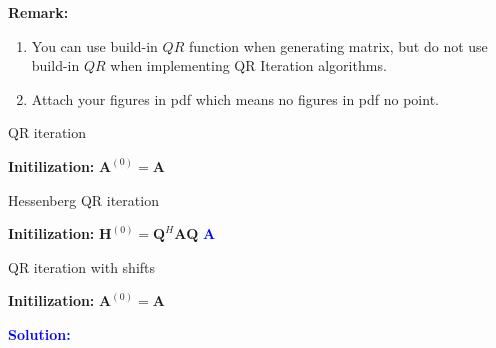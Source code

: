 \documentclass[english,onecolumn]{IEEEtran}
\begin{document}
{\bf Remark:}
\begin{enumerate}
    \item You can use build-in $QR$ function when generating matrix, but do not use build-in $QR$ when implementing QR Iteration algorithms.
    \item Attach your figures in pdf which means no figures in pdf no point.
\end{enumerate}
\begin{algorithm}[htbp]
	\label{alg:QR_Iteration}
	\caption{QR iteration}
	\SetAlgoLined
	\textbf{Initilization:} $\mathbf{A}^{(0)} = \mathbf{A}$\\
\end{algorithm}

\begin{algorithm}[htbp]
	\label{alg:Hessen_QR_Iteration}
	\caption{Hessenberg QR iteration}
	\SetAlgoLined
 	\textbf{Initilization:} $\mathbf{H}^{(0)} = \mathbf{Q}^{H}\mathbf{A}\mathbf{Q}$ \quad\textcolor{blue}{$\mathbf{A}$}\\
\end{algorithm}

\begin{algorithm}[htbp!]
	\label{alg:Shifted_QR_Iteration}
	\caption{QR iteration with shifts}
	\SetAlgoLined
	\textbf{Initilization:} $\mathbf{A}^{(0)} = \mathbf{A}$\\
\end{algorithm}

\newpage
\noindent\textcolor{blue}{
	\textbf{Solution:}
	}
\end{document}
